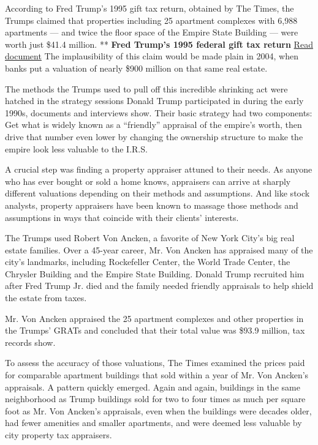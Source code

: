 According to Fred Trump's 1995 gift tax return, obtained by The Times,
the Trumps claimed that properties including 25 apartment complexes with
6,988 apartments --- and twice the floor space of the Empire State
Building --- were worth just \$41.4 million. ** \textbf{Fred Trump's
1995 federal gift tax return}
\href{https://int.graylady3jvrrxbe.onion/data/documenthelper/141-fct-federal-gift-return/9c5e1010469adaac01a2/optimized/full.pdf\#page=1}{Read
document} The implausibility of this claim would be made plain in 2004,
when banks put a valuation of nearly \$900 million on that same real
estate.

The methods the Trumps used to pull off this incredible shrinking act
were hatched in the strategy sessions Donald Trump participated in
during the early 1990s, documents and interviews show. Their basic
strategy had two components: Get what is widely known as a ``friendly''
appraisal of the empire's worth, then drive that number even lower by
changing the ownership structure to make the empire look less valuable
to the I.R.S.

A crucial step was finding a property appraiser attuned to their needs.
As anyone who has ever bought or sold a home knows, appraisers can
arrive at sharply different valuations depending on their methods and
assumptions. And like stock analysts, property appraisers have been
known to massage those methods and assumptions in ways that coincide
with their clients' interests.

The Trumps used Robert Von Ancken, a favorite of New York City's big
real estate families. Over a 45-year career, Mr. Von Ancken has
appraised many of the city's landmarks, including Rockefeller Center,
the World Trade Center, the Chrysler Building and the Empire State
Building. Donald Trump recruited him after Fred Trump Jr. died and the
family needed friendly appraisals to help shield the estate from taxes.

Mr. Von Ancken appraised the 25 apartment complexes and other properties
in the Trumps' GRATs and concluded that their total value was \$93.9
million, tax records show.

To assess the accuracy of those valuations, The Times examined the
prices paid for comparable apartment buildings that sold within a year
of Mr. Von Ancken's appraisals. A pattern quickly emerged. Again and
again, buildings in the same neighborhood as Trump buildings sold for
two to four times as much per square foot as Mr. Von Ancken's
appraisals, even when the buildings were decades older, had fewer
amenities and smaller apartments, and were deemed less valuable by city
property tax appraisers.

